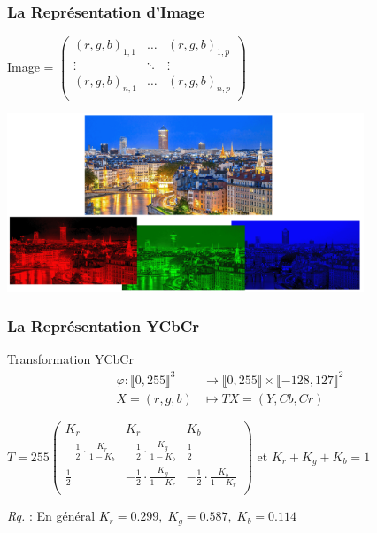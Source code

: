 \documentclass{beamer}
\begin{document}
\begin{frame}
    \frametitle{La Représentation d'Image}

    \centering

    Image = $\begin{pmatrix}
        (r,g,b)_{1,1} & \dots & (r, g, b)_{1,p} \\
        \vdots & \ddots & \vdots \\
        (r,g,b)_{n, 1} & \dots & (r, g, b)_{n, p} \\
    \end{pmatrix}$

    \vspace*{2em}

    \includegraphics[width=0.8\textwidth]{img/diff_rgb.png}

\end{frame}

\begin{frame}
    \frametitle{La Représentation YCbCr}

    \begin{block}{Transformation YCbCr}
        \begin{align*}
            \varphi \colon \llbracket 0, 255 \rrbracket^3 & \rightarrow \llbracket 0, 255 \rrbracket \times \llbracket -128, 127 \rrbracket^2 \\
            X = (r, g, b) & \longmapsto
            TX = (Y, Cb, Cr)
          \end{align*}

      \vspace*{1em}

      $ T = 255\begin{pmatrix}
        K_r & K_r & K_b \\
        - \frac{1}{2} \cdot \frac{K_r}{1 - K_b} & - \frac{1}{2} \cdot \frac{K_g}{1 - K_b} & \frac{1}{2} \\
        \frac{1}{2} & - \frac{1}{2} \cdot \frac{K_g}{1 - K_r} & - \frac{1}{2} \cdot \frac{K_b}{1 - K_r} \\
      \end{pmatrix}$ et $K_r + K_g + K_b = 1$
    \end{block}
    \textit{Rq.} : En général $K_r = 0.299,\; K_g = 0.587, \; K_b = 0.114$

\end{frame}
\end{document}
